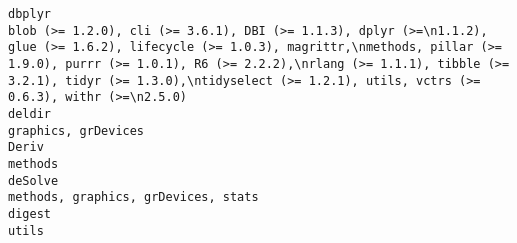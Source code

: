 \documentclass[
  letterpaper,
  DIV=11,
  numbers=noendperiod]{scrreprt}
\begin{document}
\begin{verbatim}
dbplyr                                                                                                                                                                                                                                                                                                       blob (>= 1.2.0), cli (>= 3.6.1), DBI (>= 1.1.3), dplyr (>=\n1.1.2), glue (>= 1.6.2), lifecycle (>= 1.0.3), magrittr,\nmethods, pillar (>= 1.9.0), purrr (>= 1.0.1), R6 (>= 2.2.2),\nrlang (>= 1.1.1), tibble (>= 3.2.1), tidyr (>= 1.3.0),\ntidyselect (>= 1.2.1), utils, vctrs (>= 0.6.3), withr (>=\n2.5.0)
deldir                                                                                                                                                                                                                                                                                                                                                                                                                                                                                                                                                                                                 graphics, grDevices
Deriv                                                                                                                                                                                                                                                                                                                                                                                                                                                                                                                                                                                                              methods
deSolve                                                                                                                                                                                                                                                                                                                                                                                                                                                                                                                                                                                methods, graphics, grDevices, stats
digest                                                                                                                                                                                                                                                                                                                                                                                                                                                                                                                                                                                                               utils

\end{verbatim}
\end{document}

